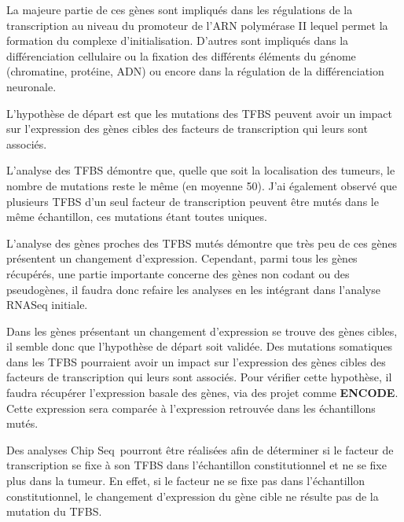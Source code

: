 La majeure partie de ces gènes sont impliqués dans les régulations de la transcription au niveau du promoteur de l'ARN polymérase II lequel permet la formation du complexe d'initialisation. D'autres sont impliqués dans la différenciation cellulaire ou la fixation des différents éléments du génome (chromatine, protéine, ADN) ou encore dans la régulation de la différenciation neuronale.

L'hypothèse de départ est que les mutations des TFBS peuvent avoir un impact sur l'expression des gènes cibles des facteurs de transcription qui leurs sont associés. 

L'analyse des TFBS démontre que, quelle que soit la localisation des tumeurs, le nombre de mutations reste le même (en moyenne 50). J'ai également observé que plusieurs TFBS d'un seul facteur de transcription peuvent être mutés dans le même échantillon, ces mutations étant toutes uniques.

L'analyse des gènes proches des TFBS mutés démontre que très peu de ces gènes présentent un changement d'expression. Cependant, parmi tous les gènes récupérés, une partie importante concerne des gènes non codant ou des pseudogènes, il faudra donc refaire les analyses en les intégrant dans l'analyse RNASeq initiale. 

Dans les gènes présentant un changement d'expression se trouve des gènes cibles, il semble donc que l'hypothèse de départ soit validée. Des mutations somatiques dans les TFBS pourraient avoir un impact sur l'expression des gènes cibles des facteurs de transcription qui leurs sont associés. Pour vérifier cette hypothèse, il faudra récupérer l'expression basale des gènes, via des projet comme \textbf{ENCODE}. Cette expression sera comparée à l'expression retrouvée dans les échantillons mutés.

Des analyses \og Chip Seq\fg ~pourront être réalisées afin de déterminer si le facteur de transcription se fixe à son TFBS dans l'échantillon constitutionnel et ne se fixe plus dans la tumeur. En effet, si le facteur ne se fixe pas dans l'échantillon constitutionnel, le changement d'expression du gène cible ne résulte pas de la mutation du TFBS.
